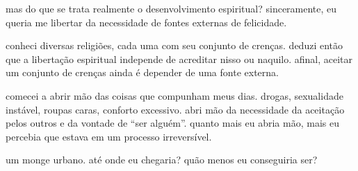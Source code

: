 mas do que se trata realmente o desenvolvimento espiritual? sinceramente, eu queria me libertar da necessidade de fontes externas de felicidade.

conheci diversas religiões, cada uma com seu conjunto de crenças. deduzi então que a libertação espiritual independe de acreditar nisso ou naquilo. afinal, aceitar um conjunto de crenças ainda é depender de uma fonte externa.

comecei a abrir mão das coisas que compunham meus dias. drogas, sexualidade instável, roupas caras, conforto excessivo. abri mão da necessidade da aceitação pelos outros e da vontade de ``ser alguém''. quanto mais eu abria mão, mais eu percebia que estava em um processo irreversível.

um monge urbano. até onde eu chegaria? quão menos eu conseguiria ser?
